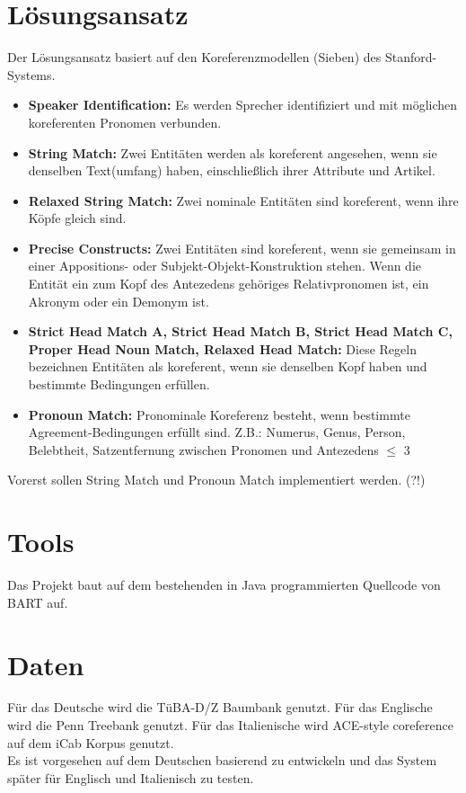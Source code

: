 \documentclass{scrartcl}
\begin{document}
\section{L\"osungsansatz}
Der L\"osungsansatz basiert auf den Koreferenzmodellen (Sieben) des Stanford-Systems.\\
\begin{itemize}


\item \textbf{Speaker Identification:} Es werden Sprecher identifiziert und mit m\"oglichen koreferenten Pronomen verbunden. 
\item \textbf{String Match:} Zwei Entit\"aten werden als koreferent angesehen, wenn sie denselben Text(umfang) haben, einschlie{\ss}lich ihrer Attribute und Artikel. 
\item \textbf{Relaxed String Match:} Zwei nominale Entit\"aten sind koreferent, wenn ihre K\"opfe gleich sind.
\item \textbf{Precise Constructs:} Zwei Entit\"aten sind koreferent, wenn sie gemeinsam in einer Appositions- oder Subjekt-Objekt-Konstruktion stehen. Wenn die Entit\"at ein zum Kopf des Antezedens geh\"origes Relativpronomen ist, ein Akronym oder ein Demonym ist. 
\item \textbf{Strict Head Match A, Strict Head Match B, Strict Head Match C, Proper Head Noun Match, Relaxed Head Match:} Diese Regeln bezeichnen Entit\"aten als koreferent, wenn sie denselben Kopf haben und bestimmte Bedingungen erf\"ullen. 
\item \textbf{Pronoun Match:} Pronominale Koreferenz besteht, wenn bestimmte Agreement-Bedingungen erf\"ullt sind. Z.B.: Numerus, Genus, Person, Belebtheit, Satzentfernung zwischen Pronomen und Antezedens ${\leq}$ 3
\end{itemize}

Vorerst sollen String Match und Pronoun Match implementiert werden. (?!)



\section{Tools}
Das Projekt baut auf dem bestehenden in Java programmierten Quellcode von BART auf. 


\section{Daten}
F\"ur das Deutsche wird die T\"uBA-D/Z Baumbank genutzt. 
F\"ur das Englische wird die Penn Treebank genutzt. 
F\"ur das Italienische wird ACE-style coreference auf dem iCab Korpus genutzt. \\
Es ist vorgesehen auf dem Deutschen basierend zu entwickeln und das System sp\"ater f\"ur Englisch und Italienisch zu testen. 



\nocite{*}


\end{document}
